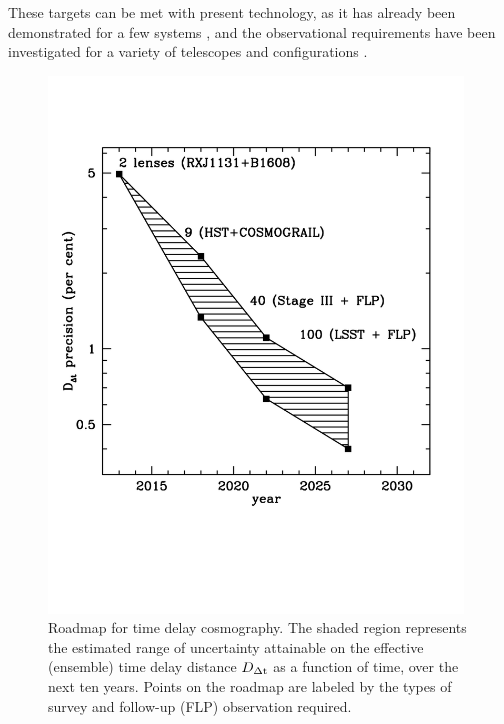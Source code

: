 These targets can be met with present technology, as it has already
been demonstrated for a few systems \citep{Tew++13,Suy++13}, and the
observational requirements have been investigated for a variety of
telescopes and configurations
\citep{Gre++13,CollettEtal2013,Men++15,Lin15}.

\begin{figure}
\includegraphics[width=0.98\textwidth]{figures/roadmap.pdf}
\caption{Roadmap for time delay cosmography. The shaded region
represents the estimated range of uncertainty attainable on the
effective (ensemble) time delay distance $D_{\Delta{\rm t}}$ as a
function of time, over the next ten years. Points on the roadmap are
labeled by the types of survey and
follow-up (FLP) observation required.}
\label{fig:roadmap}
\end{figure}

